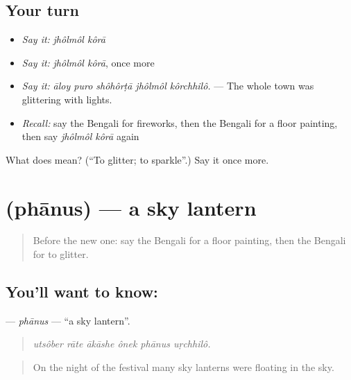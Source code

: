\subsection*{Your turn}
\begin{itemize}
\raggedright
  \item \emph{Say it:} \emph{jhôlmôl kôrā}
  \item \emph{Say it:} \emph{jhôlmôl kôrā}, once more
  \item \emph{Say it:} \emph{āloy puro shôhôrṭā jhôlmôl kôrchhilô.} — The whole town was glittering with lights.
  \item \emph{Recall:} say the Bengali for fireworks, then the Bengali for a floor painting, then say \emph{jhôlmôl kôrā} again
\end{itemize}

\begin{tcolorbox}[breakable,colback=teal!4,colframe=teal!35!black,title={Before you move on}]
What does   mean? (\textquotedblleft{}To glitter; to sparkle\textquotedblright{}.) Say it once more.
\end{tcolorbox}
\section[\texorpdfstring{\bn{ফানুস} (phānus)}{ফানুস (phānus)}]{ (phānus) — a sky lantern}

\label{lesson:BN-C305-phanus}



\begin{quote}
Before the new one: say the Bengali for a floor painting, then the Bengali for to glitter.
\end{quote}

\subsection*{You'll want to know: }
\textbf{} — \emph{phānus} — \textquotedblleft{}a sky lantern\textquotedblright{}.

\begin{quote}
     
\end{quote}

\begin{quote}
\emph{utsôber rāte ākāshe ônek phānus uṛchhilô.}
\end{quote}

\begin{quote}
On the night of the festival many sky lanterns were floating in the sky.
\end{quote}

